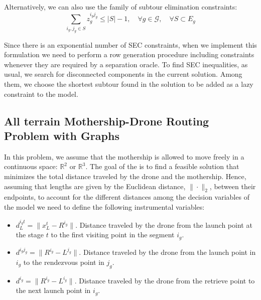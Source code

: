 Alternatively, we can also use the family of subtour elimination constraints:
\begin{equation}\tag{SEC}\label{SEC}
    \sum_{i_g, j_g \in S} z_g^{i_gj_g} \leq |S| - 1, \quad \forall g \in \mathcal G,\quad \forall S\subset E_g
\end{equation}

Since there is an exponential number of SEC constraints, when we implement this formulation we need to perform a row generation procedure including constraints whenever they are required by a separation oracle. To find SEC inequalities, as usual, we search for disconnected components in the current solution. Among them, we choose the shortest subtour found in the solution to be added as a lazy constraint to the model.

 \subsection{All terrain Mothership-Drone Routing Problem with Graphs}
In this problem, we assume that the mothership  is allowed to move freely in a continuous space: $\mathbb R^2$ or $\mathbb R^3$. The goal of the \AMD is to find a feasible solution that minimizes the total distance traveled  by the drone and  the mothership. Hence, assuming that lengths are given by the Euclidean distance, $\|\cdot\|_2$, between their endpoints, to account for the different distances among the decision variables of the model we need to define the following instrumental variables:
\begin{itemize}
    \item $d_L^{i_gt} = \|x_L^t - R^{i_g}\|$. Distance traveled by the drone from the launch point at the stage $t$ to the first visiting point in the segment $i_g$.
    \item $d^{i_gj_g} = \|R^{i_g} - L^{j_g}\|$. Distance traveled by the drone from the launch point in $i_g$ to the rendezvous point in $j_g$.
    \item $d^{i_g} = \|R^{i_g} - L^{i_g}\|$. Distance traveled by the drone from the retrieve point  to the next launch point in $i_g$.
\end{itemize}

